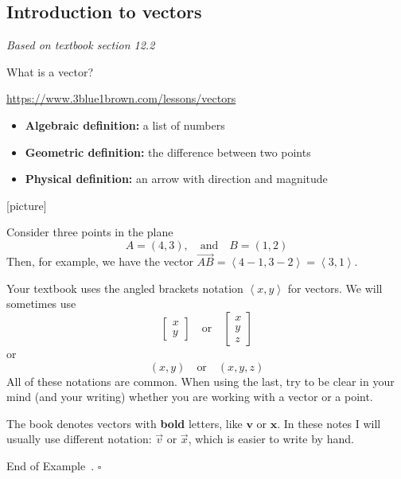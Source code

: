 \documentclass[10pt]{article}
\theoremstyle{definition}
\newtheorem{example}[theorem]{Example}
\renewenvironment{example}
{\begin{oldexample}}
  {\par\smallskip\hfill   End of Example~\theexample. $\square$    \par\end{oldexample}}
\newcommand{\1}[1]{\textbf{1}_{\left[#1\right]}} %
\begin{document}
\subsection{Introduction to vectors}
\textit{Based on textbook section 12.2}

What is a vector?

\begin{center}
  \url{https://www.3blue1brown.com/lessons/vectors}
\end{center}

\begin{itemize}
  \item \textbf{Algebraic definition:} a list of numbers
  \item \textbf{Geometric definition:} the difference between two points
  \item \textbf{Physical definition:} an arrow with direction and magnitude
\end{itemize}

[picture]


\begin{example}[Vector]
  Consider three points in the plane
  \begin{equation*}
    A = (4,3), \quad \text{and} \quad  B = (1,2)
  \end{equation*}
  Then, for example, we have the vector
  $\overrightarrow{AB} = \left\langle 4-1,3-2 \right\rangle = \left\langle 3,1 \right\rangle$.

  Your textbook uses the angled brackets notation $\left\langle x,y\right\rangle $ for vectors. We will
  sometimes use
  \begin{equation*}
    \begin{bmatrix}
      x\\y
    \end{bmatrix}
    \quad \text{or} \quad
    \begin{bmatrix}
      x\\y\\z
    \end{bmatrix}
  \end{equation*}
  or
  \begin{equation*}
    (x,y)
    \quad \text{or} \quad
    (x,y,z)
  \end{equation*}
  All of these notations are common. When using the last, try to be clear in
  your mind (and your writing) whether you are working with a vector or a point.

  The book denotes vectors with \textbf{bold} letters, like $\mathbf{v}$ or $\mathbf{x}$. In these notes
  I will usually use different notation: $\vec{v}$ or $\vec{x}$, which is easier to write by hand.
\end{example}
\end{document}
